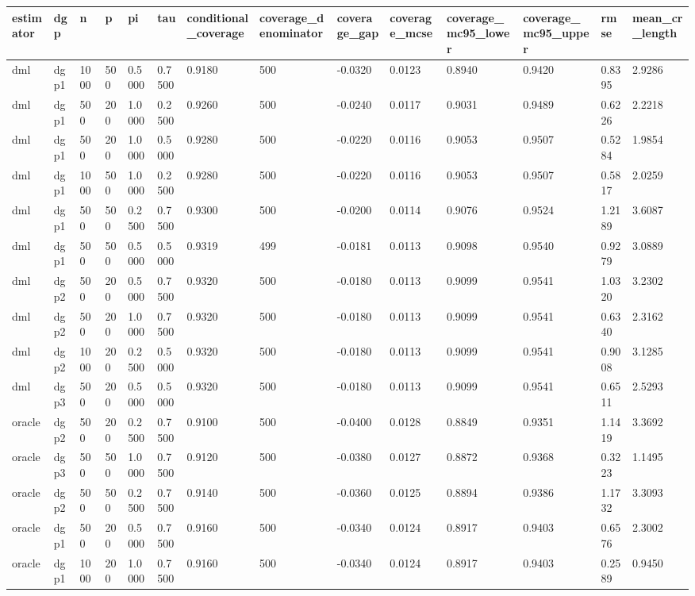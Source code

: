 \begin{tabular}{llllllllllllll}
\hline
estimator & dgp & n & p & pi & tau & conditional\_coverage & coverage\_denominator & coverage\_gap & coverage\_mcse & coverage\_mc95\_lower & coverage\_mc95\_upper & rmse & mean\_cr\_length \\
\hline
dml & dgp1 & 1000 & 500 & 0.5000 & 0.7500 & 0.9180 & 500 & -0.0320 & 0.0123 & 0.8940 & 0.9420 & 0.8395 & 2.9286 \\
dml & dgp1 & 500 & 200 & 1.0000 & 0.2500 & 0.9260 & 500 & -0.0240 & 0.0117 & 0.9031 & 0.9489 & 0.6226 & 2.2218 \\
dml & dgp1 & 500 & 200 & 1.0000 & 0.5000 & 0.9280 & 500 & -0.0220 & 0.0116 & 0.9053 & 0.9507 & 0.5284 & 1.9854 \\
dml & dgp1 & 1000 & 500 & 1.0000 & 0.2500 & 0.9280 & 500 & -0.0220 & 0.0116 & 0.9053 & 0.9507 & 0.5817 & 2.0259 \\
dml & dgp1 & 500 & 500 & 0.2500 & 0.7500 & 0.9300 & 500 & -0.0200 & 0.0114 & 0.9076 & 0.9524 & 1.2189 & 3.6087 \\
dml & dgp1 & 500 & 500 & 0.5000 & 0.5000 & 0.9319 & 499 & -0.0181 & 0.0113 & 0.9098 & 0.9540 & 0.9279 & 3.0889 \\
dml & dgp2 & 500 & 200 & 0.5000 & 0.7500 & 0.9320 & 500 & -0.0180 & 0.0113 & 0.9099 & 0.9541 & 1.0320 & 3.2302 \\
dml & dgp2 & 500 & 200 & 1.0000 & 0.7500 & 0.9320 & 500 & -0.0180 & 0.0113 & 0.9099 & 0.9541 & 0.6340 & 2.3162 \\
dml & dgp2 & 1000 & 200 & 0.2500 & 0.5000 & 0.9320 & 500 & -0.0180 & 0.0113 & 0.9099 & 0.9541 & 0.9008 & 3.1285 \\
dml & dgp3 & 500 & 200 & 0.5000 & 0.5000 & 0.9320 & 500 & -0.0180 & 0.0113 & 0.9099 & 0.9541 & 0.6511 & 2.5293 \\
oracle & dgp2 & 500 & 200 & 0.2500 & 0.7500 & 0.9100 & 500 & -0.0400 & 0.0128 & 0.8849 & 0.9351 & 1.1419 & 3.3692 \\
oracle & dgp3 & 500 & 500 & 1.0000 & 0.7500 & 0.9120 & 500 & -0.0380 & 0.0127 & 0.8872 & 0.9368 & 0.3223 & 1.1495 \\
oracle & dgp2 & 500 & 500 & 0.2500 & 0.7500 & 0.9140 & 500 & -0.0360 & 0.0125 & 0.8894 & 0.9386 & 1.1732 & 3.3093 \\
oracle & dgp1 & 500 & 200 & 0.5000 & 0.7500 & 0.9160 & 500 & -0.0340 & 0.0124 & 0.8917 & 0.9403 & 0.6576 & 2.3002 \\
oracle & dgp1 & 1000 & 200 & 1.0000 & 0.7500 & 0.9160 & 500 & -0.0340 & 0.0124 & 0.8917 & 0.9403 & 0.2589 & 0.9450 \\

\end{tabular}
